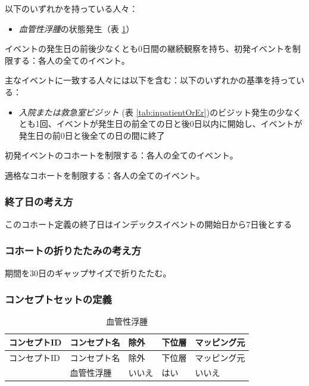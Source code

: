 \documentclass[
  11pt]{book}
\providecommand{\tightlist}{%
  \setlength{\itemsep}{0pt}\setlength{\parskip}{0pt}}
\theoremstyle{definition}
\theoremstyle{definition}
\theoremstyle{definition}
\theoremstyle{definition}
\theoremstyle{remark}
\begin{document}
以下のいずれかを持っている人々：

\begin{itemize}
\tightlist
\item
  \emph{血管性浮腫}の状態発生（表 \ref{tab:angioedema}）
\end{itemize}

イベントの発生日の前後少なくとも0日間の継続観察を持ち、初発イベントを制限する：各人の全てのイベント。

主なイベントに一致する人々には以下を含む：以下のいずれかの基準を持っている：

\begin{itemize}
\tightlist
\item
  \emph{入院または救急室ビジット} (表 \ref{tab:inpatientOrEr})のビジット発生の少なくとも1回、イベントが発生日の前全ての日と後0日以内に開始し、イベントが発生日の前0日と後全ての日の間に終了
\end{itemize}

初発イベントのコホートを制限する：各人の全てのイベント。

適格なコホートを制限する：各人の全てのイベント。

\subsubsection*{終了日の考え方}\label{ux7d42ux4e86ux65e5ux306eux8003ux3048ux65b9-1}

このコホート定義の終了日はインデックスイベントの開始日から7日後とする

\subsubsection*{コホートの折りたたみの考え方}\label{ux30b3ux30dbux30fcux30c8ux306eux6298ux308aux305fux305fux307fux306eux8003ux3048ux65b9}

期間を30日のギャップサイズで折りたたむ。

\subsubsection*{コンセプトセットの定義}\label{ux30b3ux30f3ux30bbux30d7ux30c8ux30bbux30c3ux30c8ux306eux5b9aux7fa9-1}

\begin{longtable}[]{@{}lllll@{}}
\caption{\label{tab:angioedema} 血管性浮腫}\tabularnewline
\toprule\noalign{}
コンセプトID & コンセプト名 & 除外 & 下位層 & マッピング元 \\
\midrule\noalign{}
\endfirsthead
\toprule\noalign{}
コンセプトID & コンセプト名 & 除外 & 下位層 & マッピング元 \\
\midrule\noalign{}
\endhead
\bottomrule\noalign{}
\endlastfoot
432791 & 血管性浮腫 & いいえ & はい & いいえ \\
\end{longtable}
\end{document}
